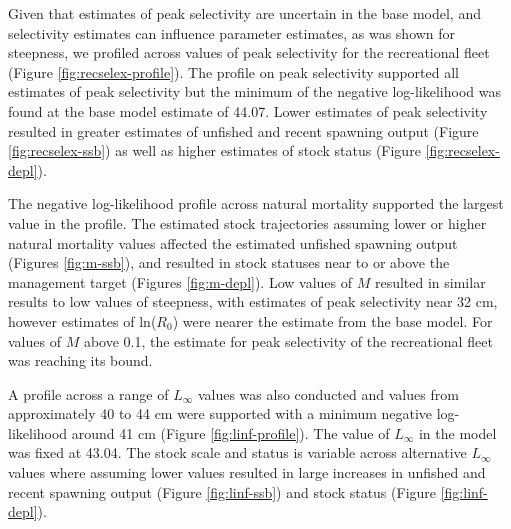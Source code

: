 \documentclass[11pt,
  english,
  letterpaper,
]{article}
\begin{document}
\leavevmode\tagmcend\tagstructend\par


Given that estimates of peak selectivity are uncertain in the base model, and selectivity estimates can influence parameter estimates, as was shown for steepness, we profiled across values of peak selectivity for the recreational fleet (Figure \ref{fig:recselex-profile}). The profile on peak selectivity supported all estimates of peak selectivity but the minimum of the negative log-likelihood was found at the base model estimate of 44.07. Lower estimates of peak selectivity resulted in greater estimates of unfished and recent spawning output (Figure \ref{fig:recselex-ssb}) as well as higher estimates of stock status (Figure \ref{fig:recselex-depl}).

\leavevmode\tagmcend\tagstructend\par


The negative log-likelihood profile across natural mortality supported the largest value in the profile. The estimated stock trajectories assuming lower or higher natural mortality values affected the estimated unfished spawning output (Figures \ref{fig:m-ssb}), and resulted in stock statuses near to or above the management target (Figures \ref{fig:m-depl}). Low values of {\(M\)\leavevmode\tagmcend\tagstructend} resulted in similar results to low values of steepness, with estimates of peak selectivity near 32 cm, however estimates of ln({\(R_0\)\leavevmode\tagmcend\tagstructend}) were nearer the estimate from the base model. For values of {\(M\)\leavevmode\tagmcend\tagstructend} above 0.1, the estimate for peak selectivity of the recreational fleet was reaching its bound.

\leavevmode\tagmcend\tagstructend\par


A profile across a range of {\(L_{\infty}\)\leavevmode\tagmcend\tagstructend} values was also conducted and values from approximately 40 to 44 cm were supported with a minimum negative log-likelihood around 41 cm (Figure \ref{fig:linf-profile}). The value of {\(L_{\infty}\)\leavevmode\tagmcend\tagstructend} in the model was fixed at 43.04. The stock scale and status is variable across alternative {\(L_{\infty}\)\leavevmode\tagmcend\tagstructend} values where assuming lower values resulted in large increases in unfished and recent spawning output (Figure \ref{fig:linf-ssb}) and stock status (Figure \ref{fig:linf-depl}).
\end{document}
